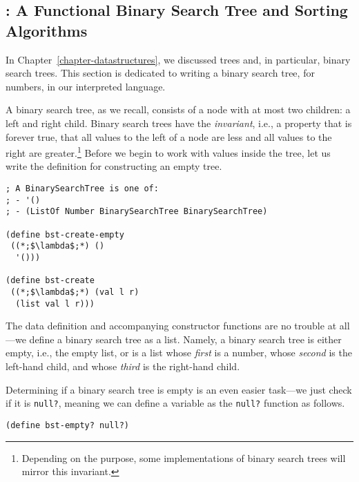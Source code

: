 \clearpage
\subsection*{: A Functional Binary Search Tree and Sorting Algorithms}

In Chapter~\ref{chapter-datastructures}, we discussed trees and, in particular, binary search trees. This section is dedicated to writing a binary search tree, for numbers, in our interpreted language. 

A binary search tree, as we recall, consists of a node with at most two children: a left and right child. Binary search trees have the \textit{invariant}, i.e., a property that is forever true, that all values to the left of a node are less and all values to the right are greater.\footnote{Depending on the purpose, some implementations of binary search trees will mirror this invariant.} Before we begin to work with values inside the tree, let us write the definition for constructing an empty tree.

\begin{cl}[]{}\begin{lstlisting}[language=MyScheme]
; A BinarySearchTree is one of:
; - '()
; - (ListOf Number BinarySearchTree BinarySearchTree)

(define bst-create-empty
 ((*;$\lambda$;*) ()
  '()))

(define bst-create
 ((*;$\lambda$;*) (val l r)
  (list val l r)))
\end{lstlisting}\end{cl}

The data definition and accompanying constructor functions are no trouble at all---we define a binary search tree as a list. Namely, a binary search tree is either empty, i.e., the empty list, or is a list whose \textit{first} is a number, whose \textit{second} is the left-hand child, and whose \textit{third} is the right-hand child.

Determining if a binary search tree is empty is an even easier task---we just check if it is \texttt{null?}, meaning we can define a variable as the \texttt{null?} function as follows.

\begin{cl}[]{}\begin{lstlisting}[language=MyScheme]
(define bst-empty? null?)
\end{lstlisting}\end{cl}

